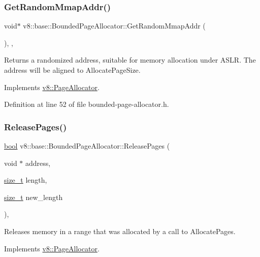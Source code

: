 \subsubsection{\texorpdfstring{Get\+Random\+Mmap\+Addr()}{GetRandomMmapAddr()}}
{\footnotesize\ttfamily void$\ast$ v8\+::base\+::\+Bounded\+Page\+Allocator\+::\+Get\+Random\+Mmap\+Addr (\begin{DoxyParamCaption}{ }\end{DoxyParamCaption})\hspace{0.3cm}{\ttfamily [inline]}, {\ttfamily [override]}, {\ttfamily [virtual]}}

Returns a randomized address, suitable for memory allocation under A\+S\+LR. The address will be aligned to Allocate\+Page\+Size. 

Implements \mbox{\hyperlink{classv8_1_1PageAllocator_a37f194f9c5fdbe5105476cbd1432418c}{v8\+::\+Page\+Allocator}}.



Definition at line 52 of file bounded-\/page-\/allocator.\+h.

\mbox{\label{classv8_1_1base_1_1BoundedPageAllocator_abf47c5cae52f79c77bfc6bdcbcced44a}} 
\subsubsection{\texorpdfstring{Release\+Pages()}{ReleasePages()}}
{\footnotesize\ttfamily \mbox{\hyperlink{classbool}{bool}} v8\+::base\+::\+Bounded\+Page\+Allocator\+::\+Release\+Pages (\begin{DoxyParamCaption}\item[{void $\ast$}]{address,  }\item[{\mbox{\hyperlink{classsize__t}{size\+\_\+t}}}]{length,  }\item[{\mbox{\hyperlink{classsize__t}{size\+\_\+t}}}]{new\+\_\+length }\end{DoxyParamCaption})\hspace{0.3cm}{\ttfamily [override]}, {\ttfamily [virtual]}}

Releases memory in a range that was allocated by a call to Allocate\+Pages. 

Implements \mbox{\hyperlink{classv8_1_1PageAllocator_a6eb6bd93c8880dd022a61a13c65f66c0}{v8\+::\+Page\+Allocator}}.



